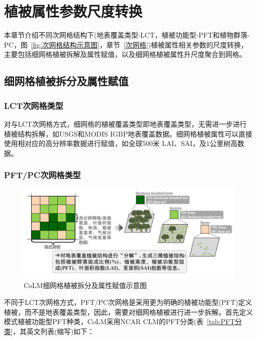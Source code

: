 \chapter{植被属性参数尺度转换}\label{植被尺度转换}

本章节介绍不同次网格结构下(地表覆盖类型-LCT，植被功能型-PFT和植物群落-PC，图~\ref{fig:次网格结构示意图}，章节~\ref{次网格})植被属性相关参数的尺度转换，主要包括细网格植被拆解及属性赋值，以及细网格植被属性升尺度聚合到网格。

\section{细网格植被拆分及属性赋值}
\subsection{LCT次网格类型}

对与LCT次网格方式，细网格的植被覆盖类型即地表覆盖类型，无需进一步进行植被结构拆解，如USGS和MODIS IGBP地表覆盖数据。细网格植被属性可以直接使用相对应的高分辨率数据进行赋值，如全球500米 LAI、SAI，及1公里树高数据。

\subsection{PFT/PC次网格类型}

{
\begin{figure}[htbp]
\centering
\includegraphics[width=1\textwidth]{Figures/尺度转换/细网格植被覆盖类型及占比拆分示意图.png}
\caption{CoLM细网格植被拆分及属性赋值示意图}
\label{fig:细网格拆分示意图}
\end{figure}
}

不同于LCT次网格方式，PFT/PC次网格是采用更为明确的植被功能型(PFT)定义植被，而不是地表覆盖类型，因此，需要对细网格植被进行进一步拆解。首先定义模式植被功能型PFT种类，CoLM采用NCAR CLM的PFT分类(表~\ref{tab:PFT分类}，其英文列表(缩写)如下：

